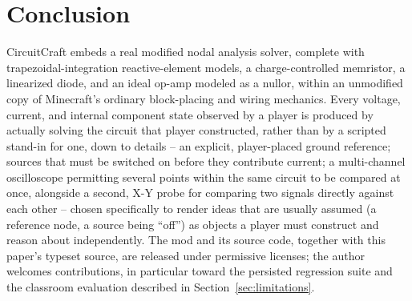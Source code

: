\section{Conclusion}
\label{sec:conclusion}

CircuitCraft embeds a real modified nodal analysis solver, complete with
trapezoidal-integration reactive-element models, a charge-controlled memristor, a linearized
diode, and an ideal op-amp modeled as a nullor, within an unmodified copy of Minecraft's
ordinary block-placing and wiring mechanics. Every voltage, current, and internal component
state observed by a player is produced by actually solving the circuit that player
constructed, rather than by a scripted stand-in for one, down to details -- an explicit,
player-placed ground reference; sources that must be switched on before they contribute
current; a multi-channel oscilloscope permitting several points within the same circuit to
be compared at once, alongside a second, X-Y probe for comparing two signals directly against
each other -- chosen specifically to render ideas that are usually assumed (a reference node,
a source being ``off'') as objects a player must construct and reason about independently. The mod and its source code, together with this
paper's typeset source, are released under permissive licenses; the author welcomes
contributions, in particular toward the persisted regression suite and the classroom
evaluation described in Section~\ref{sec:limitations}.
